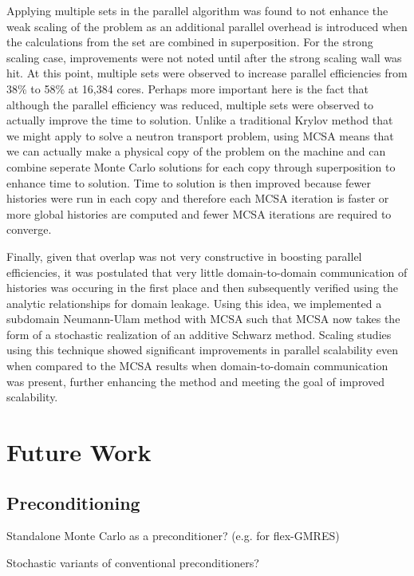 Applying multiple sets in the parallel algorithm was found to not
enhance the weak scaling of the problem as an additional parallel
overhead is introduced when the calculations from the set are combined
in superposition. For the strong scaling case, improvements were not
noted until after the strong scaling wall was hit. At this point,
multiple sets were observed to increase parallel efficiencies from
38\% to 58\% at 16,384 cores. Perhaps more important here is the fact
that although the parallel efficiency was reduced, multiple sets were
observed to actually improve the time to solution. Unlike a
traditional Krylov method that we might apply to solve a neutron
transport problem, using MCSA means that we can actually make a
physical copy of the problem on the machine and can combine seperate
Monte Carlo solutions for each copy through superposition to enhance
time to solution. Time to solution is then improved because fewer
histories were run in each copy and therefore each MCSA iteration is
faster or more global histories are computed and fewer MCSA iterations
are required to converge.

Finally, given that overlap was not very constructive in boosting
parallel efficiencies, it was postulated that very little
domain-to-domain communication of histories was occuring in the first
place and then subsequently verified using the analytic relationships
for domain leakage. Using this idea, we implemented a subdomain
Neumann-Ulam method with MCSA such that MCSA now takes the form of a
stochastic realization of an additive Schwarz method. Scaling studies
using this technique showed significant improvements in parallel
scalability even when compared to the MCSA results when
domain-to-domain communication was present, further enhancing the
method and meeting the goal of improved scalability.

\section{Future Work\ }
\label{sec:future_work}

\subsection{Preconditioning}
\label{subsec:future_preconditioning}

Standalone Monte Carlo as a preconditioner? (e.g. for flex-GMRES)

Stochastic variants of conventional preconditioners?

